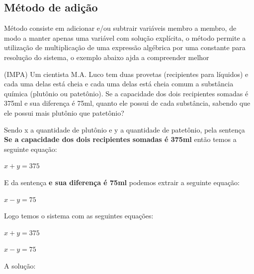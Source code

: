 \begin{multicols*}{2}
    \subsection*{Método de adição}
    Método consiste em adicionar e/ou subtrair variáveis membro a membro, de modo a manter apenas 			uma variável com solução explícita, o método permite a utilização de multiplicação de uma 				expressão algébrica por uma constante para resolução do sistema, o exemplo abaixo ajda a 				compreender melhor

    (IMPA) Um cientista M.A. Luco tem duas provetas (recipientes para líquidos) e cada uma delas 			está cheia e cada uma delas está cheia comum a substância química (plutônio ou patetônio). Se a 			capacidade dos dois recipientes somadas é 375ml e sua diferença é 75ml, quanto ele possui de 			cada substância, sabendo que ele possui mais plutônio que patetônio?

    Sendo x a quantidade de plutônio e y a quantidade de patetônio, pela sentença \textbf{ Se a 			capacidade dos dois recipientes somadas é 375ml} então temos a seguinte equação:

    $x + y = 375 $

    E da sentença \textbf{e sua diferença é 75ml} podemos extrair a seguinte equação:

    $x - y = 75$

    Logo temos o sistema com as seguintes equações:

    $x + y = 375 $

    $x - y = 75$

    A solução:




    \begin{figure}[H]
        \centering
\end{figure}
\end{multicols*}
